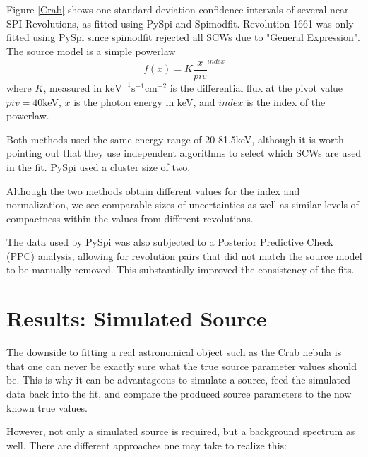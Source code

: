\documentclass{article}
\begin{document}
Figure \ref{Crab} shows one standard deviation confidence intervals of several near SPI Revolutions, as fitted using PySpi and Spimodfit. Revolution 1661 was only fitted using PySpi since spimodfit rejected all SCWs due to "General Expression". The source model is a simple powerlaw 
\begin{equation} \label{powerlaw}
    f(x) = K \frac{x}{piv}^{index}
\end{equation}
where $K$, measured in $\text{keV}^{-1}\text{s}^{-1}\text{cm}^{-2}$ is the differential flux at the pivot value $piv=40$keV, $x$ is the photon energy in keV, and $index$ is the index of the powerlaw.

Both methods used the same energy range of 20-81.5keV, although it is worth pointing out that they use independent algorithms to select which SCWs are used in the fit. PySpi used a cluster size of two. 

Although the two methods obtain different values for the index and normalization, we see comparable sizes of uncertainties as well as similar levels of compactness within the values from different revolutions. 

The data used by PySpi was also subjected to a Posterior Predictive Check (PPC) analysis, allowing for revolution pairs that did not match the source model to be manually removed. This substantially improved the consistency of the fits.

\section{Results: Simulated Source} \label{Sec: Sim Source}
The downside to fitting a real astronomical object such as the Crab nebula is that one can never be exactly sure what the true source parameter values should be. This is why it can be advantageous to simulate a source, feed the simulated data back into the fit, and compare the produced source parameters to the now known true values.

However, not only a simulated source is required, but a background spectrum as well. There are different approaches one may take to realize this:
\end{document}
